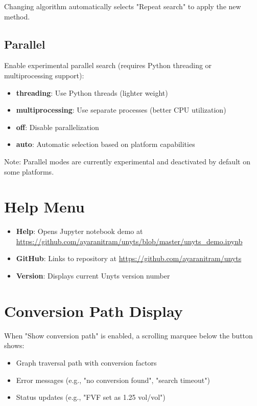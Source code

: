 \documentclass[11pt,a4paper]{report}
\begin{document}
Changing algorithm automatically selects "Repeat search" to apply the new method.

\subsection{Parallel}

Enable experimental parallel search (requires Python threading or multiprocessing support):

\begin{itemize}
\item \textbf{threading}: Use Python threads (lighter weight)
\item \textbf{multiprocessing}: Use separate processes (better CPU utilization)
\item \textbf{off}: Disable parallelization
\item \textbf{auto}: Automatic selection based on platform capabilities
\end{itemize}

Note: Parallel modes are currently experimental and deactivated by default on some platforms.

\section{Help Menu}

\begin{itemize}
\item \textbf{Help}: Opens Jupyter notebook demo at \url{https://github.com/ayaranitram/unyts/blob/master/unyts_demo.ipynb}
\item \textbf{GitHub}: Links to repository at \url{https://github.com/ayaranitram/unyts}
\item \textbf{Version}: Displays current Unyts version number
\end{itemize}

\section{Conversion Path Display}

When "Show conversion path" is enabled, a scrolling marquee below the button shows:

\begin{itemize}
\item Graph traversal path with conversion factors
\item Error messages (e.g., "no conversion found", "search timeout")
\item Status updates (e.g., "FVF set as 1.25 vol/vol")
\end{itemize}
\end{document}
